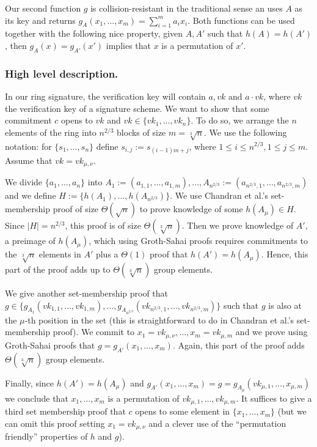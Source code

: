 Our second function $g$ is collision-resistant in the traditional sense an uses $A$ as its key and returns $g_A(x_1,\ldots,x_m) = \sum_{i=1}^m a_ix_i$. Both functions can be used together with the following nice property, given $A,A'$ such that $h(A)=h(A')$, then $g_A(x)=g_{A'}(x')$ implies that $x$ is a permutation of $x'$.

\subsubsection{High level description.}
In our ring signature, the verification key will contain $a,vk$ and $a\cdot vk$, where $vk$ the verification key of a signature scheme. We want to show that some commitment $c$ opens to $vk$ and $vk\in\{vk_1,\ldots,vk_n\}$. To do so, we arrange the $n$ elements of the ring into $n^{2/3}$ blocks of size $m=\sqrt[3]{n}$. We use the following notation: for $\{s_1,\ldots, s_n\}$ define $s_{i,j}:=s_{(i-1)m+j}$, where  $1\leq i \leq n^{2/3},1\leq  j \leq m$. Assume that $vk = vk_{\mu,\nu}$.

We divide $\{a_{1},\ldots, a_{n}\}$ into $A_1 := (a_{1,1},\ldots,a_{1,m}),\ldots, A_{n^{2/3}} := (a_{n^{2/3},1},\ldots,\allowbreak a_{n^{2/3},m})$ and we define $H\allowbreak:=\{h(A_1),\allowbreak\ldots,\allowbreak h(A_{n^{2/3}})\}.$  
We use Chandran et al.'s set-membership proof of size $\Theta(\sqrt{n})$ to prove knowledge of some $h(A_\mu)\in H$. Since $|H|=n^{2/3}$, this proof is of size $\Theta(\sqrt[3]{n})$. Then we prove knowledge of $A'$, a preimage of $h(A_\mu)$, which using Groth-Sahai proofs requires commitments to the $\sqrt[3]{n}$ elements in $A'$ plus a $\Theta(1)$ proof that $h(A')=h(A_\mu)$. Hence, this part of the proof adds up to $\Theta(\sqrt[3]{n})$ group elements.

We give another set-membership proof that
$g\in\{
g_{A_1}(vk_{1,1},\ldots,vk_{1,m}),
\ldots,\allowbreak
g_{A_{n^{2/3}}}(
	vk_{n^{2/3},1},
	\ldots,
	vk_{n^{2/3},m})\}$ such that $g$ is also at the $\mu$-th position in the set (this is straightforward to do in Chandran et al.'s set-membership proof).
We commit to $x_1=vk_{\mu,\nu},\ldots,x_m=vk_{\mu,m}$ and we prove using Groth-Sahai proofs that $g = g_{A'}(x_1,\ldots,x_m)$. Again, this part of the proof adds $\Theta(\sqrt[3]{n})$ group elements.

Finally, since $h(A')=h(A_\mu)$ and $g_{A'}(x_1,\ldots,x_m) = g = g_{A_{\mu}}(vk_{\mu,1},\ldots,x_{\mu,m})$ we conclude that $x_1,\ldots,x_m$ is a permutation of $vk_{\mu,1},\ldots,vk_{\mu,m}$. It suffices to give a third set membership proof that $c$ opens to some element in $\{x_1,\ldots,x_m\}$ (but we can omit this proof setting $x_1 =vk_{\mu,\nu}$ and a clever use of the ``permutation friendly'' properties of $h$ and $g$).